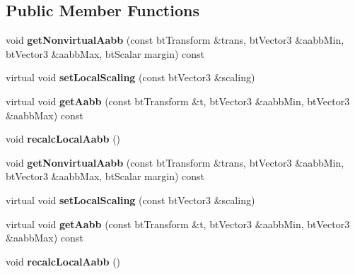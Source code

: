 \subsection*{Public Member Functions}
\begin{DoxyCompactItemize}
\item 
\mbox{\label{classbtPolyhedralConvexAabbCachingShape_afd51295e99c347357c645a72bf81a7fb}} 
void {\bfseries get\+Nonvirtual\+Aabb} (const bt\+Transform \&trans, bt\+Vector3 \&aabb\+Min, bt\+Vector3 \&aabb\+Max, bt\+Scalar margin) const
\item 
\mbox{\label{classbtPolyhedralConvexAabbCachingShape_a7c49c07bfcc3fc094fc23abc28543b2c}} 
virtual void {\bfseries set\+Local\+Scaling} (const bt\+Vector3 \&scaling)
\item 
\mbox{\label{classbtPolyhedralConvexAabbCachingShape_a994b79b0024d64dec661c32a539d784c}} 
virtual void {\bfseries get\+Aabb} (const bt\+Transform \&t, bt\+Vector3 \&aabb\+Min, bt\+Vector3 \&aabb\+Max) const
\item 
\mbox{\label{classbtPolyhedralConvexAabbCachingShape_a087f6944dc205a325e0d1e8f79968289}} 
void {\bfseries recalc\+Local\+Aabb} ()
\item 
\mbox{\label{classbtPolyhedralConvexAabbCachingShape_afd51295e99c347357c645a72bf81a7fb}} 
void {\bfseries get\+Nonvirtual\+Aabb} (const bt\+Transform \&trans, bt\+Vector3 \&aabb\+Min, bt\+Vector3 \&aabb\+Max, bt\+Scalar margin) const
\item 
\mbox{\label{classbtPolyhedralConvexAabbCachingShape_a8d96738ac0d6b7036352a1e2527352dc}} 
virtual void {\bfseries set\+Local\+Scaling} (const bt\+Vector3 \&scaling)
\item 
\mbox{\label{classbtPolyhedralConvexAabbCachingShape_aa063f3d7f47806703779a2d795d43c29}} 
virtual void {\bfseries get\+Aabb} (const bt\+Transform \&t, bt\+Vector3 \&aabb\+Min, bt\+Vector3 \&aabb\+Max) const
\item 
\mbox{\label{classbtPolyhedralConvexAabbCachingShape_a087f6944dc205a325e0d1e8f79968289}} 
void {\bfseries recalc\+Local\+Aabb} ()
\end{DoxyCompactItemize}
